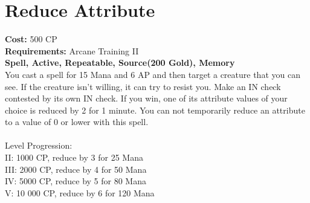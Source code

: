 \section{Reduce Attribute}
\textbf{Cost:} 500 CP\\
\textbf{Requirements:} Arcane Training II\\
\textbf{Spell, Active, Repeatable, Source(200 Gold), Memory}\\
You cast a spell for 15 Mana and 6 AP and then target a creature that you can see. If the creature isn’t willing, it can try to resist you. Make an IN check contested by its own IN check. If you win, one of its attribute values of your choice is reduced by 2 for 1 minute. You can not temporarily reduce an attribute to a value of 0 or lower with this spell. \\
\\
Level Progression:\\
II: 1000 CP, reduce by 3 for 25 Mana\\
III: 2000 CP, reduce by 4 for 50 Mana\\
IV: 5000 CP, reduce by 5 for 80 Mana\\
V: 10 000 CP, reduce by 6 for 120 Mana\\